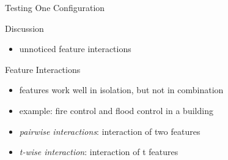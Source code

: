 \begin{frame}{Testing One Configuration}
\begin{fancycolumns}
\begin{note}{Discussion}
\begin{itemize}
				\item unnoticed feature interactions
			\end{itemize}
		\end{note}
		\begin{definition}{Feature Interactions} %
			\begin{itemize}
				\item features work well in isolation, but not in combination
				\item example: fire control and flood control in a building
				\item \emph{pairwise interactions}: interaction of two features
				\item \emph{t-wise interaction}: interaction of t features
			\end{itemize}
		\end{definition}
	\end{fancycolumns}
\end{frame}

